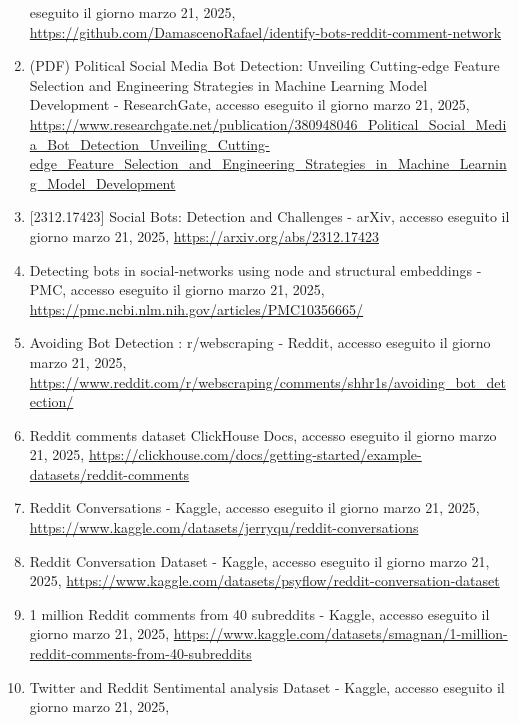 \documentclass[
  12pt,
  letterpaper,
  DIV=11,
  numbers=noendperiod]{scrartcl}
\begin{document}
\begin{enumerate}
  eseguito il giorno marzo 21, 2025,
  \url{https://github.com/DamascenoRafael/identify-bots-reddit-comment-network}\\
\item
  (PDF) Political Social Media Bot Detection: Unveiling Cutting-edge
  Feature Selection and Engineering Strategies in Machine Learning Model
  Development - ResearchGate, accesso eseguito il giorno marzo 21, 2025,
  \url{https://www.researchgate.net/publication/380948046_Political_Social_Media_Bot_Detection_Unveiling_Cutting-edge_Feature_Selection_and_Engineering_Strategies_in_Machine_Learning_Model_Development}\\
\item
  {[}2312.17423{]} Social Bots: Detection and Challenges - arXiv,
  accesso eseguito il giorno marzo 21, 2025,
  \url{https://arxiv.org/abs/2312.17423}\\
\item
  Detecting bots in social-networks using node and structural embeddings
  - PMC, accesso eseguito il giorno marzo 21, 2025,
  \url{https://pmc.ncbi.nlm.nih.gov/articles/PMC10356665/}\\
\item
  Avoiding Bot Detection : r/webscraping - Reddit, accesso eseguito il
  giorno marzo 21, 2025,
  \url{https://www.reddit.com/r/webscraping/comments/shhr1s/avoiding_bot_detection/}\\
\item
  Reddit comments dataset \textbar{} ClickHouse Docs, accesso eseguito
  il giorno marzo 21, 2025,
  \url{https://clickhouse.com/docs/getting-started/example-datasets/reddit-comments}\\
\item
  Reddit Conversations - Kaggle, accesso eseguito il giorno marzo 21,
  2025,
  \url{https://www.kaggle.com/datasets/jerryqu/reddit-conversations}\\
\item
  Reddit Conversation Dataset - Kaggle, accesso eseguito il giorno marzo
  21, 2025,
  \url{https://www.kaggle.com/datasets/psyflow/reddit-conversation-dataset}\\
\item
  1 million Reddit comments from 40 subreddits - Kaggle, accesso
  eseguito il giorno marzo 21, 2025,
  \url{https://www.kaggle.com/datasets/smagnan/1-million-reddit-comments-from-40-subreddits}\\
\item
  Twitter and Reddit Sentimental analysis Dataset - Kaggle, accesso
  eseguito il giorno marzo 21, 2025,

\end{enumerate}
\end{document}
